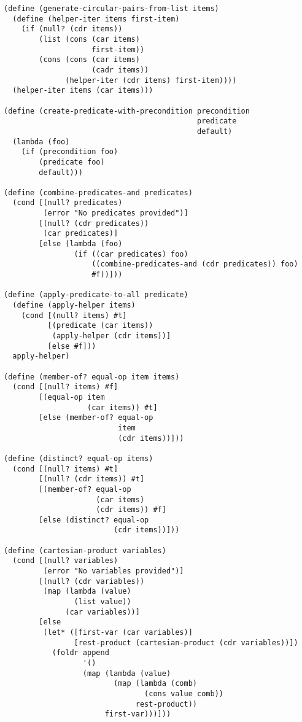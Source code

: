 \documentclass[../main.tex]{subfiles}
\begin{document}
\begin{lstlisting}
(define (generate-circular-pairs-from-list items)
  (define (helper-iter items first-item)
    (if (null? (cdr items))
        (list (cons (car items)
                    first-item))
        (cons (cons (car items)
                    (cadr items))
              (helper-iter (cdr items) first-item))))
  (helper-iter items (car items)))

(define (create-predicate-with-precondition precondition
                                            predicate
                                            default)
  (lambda (foo)
    (if (precondition foo)
        (predicate foo)
        default)))

(define (combine-predicates-and predicates)
  (cond [(null? predicates)
         (error "No predicates provided")]
        [(null? (cdr predicates))
         (car predicates)]
        [else (lambda (foo)
                (if ((car predicates) foo)
                    ((combine-predicates-and (cdr predicates)) foo)
                    #f))]))

(define (apply-predicate-to-all predicate)
  (define (apply-helper items)
    (cond [(null? items) #t]
          [(predicate (car items))
           (apply-helper (cdr items))]
          [else #f]))
  apply-helper)

(define (member-of? equal-op item items)
  (cond [(null? items) #f]
        [(equal-op item
                   (car items)) #t]
        [else (member-of? equal-op
                          item
                          (cdr items))]))

(define (distinct? equal-op items)
  (cond [(null? items) #t]
        [(null? (cdr items)) #t]
        [(member-of? equal-op
                     (car items)
                     (cdr items)) #f]
        [else (distinct? equal-op
                         (cdr items))]))

(define (cartesian-product variables)
  (cond [(null? variables)
         (error "No variables provided")]
        [(null? (cdr variables))
         (map (lambda (value)
                (list value))
              (car variables))]
        [else
         (let* ([first-var (car variables)]
                [rest-product (cartesian-product (cdr variables))])
           (foldr append
                  '()
                  (map (lambda (value)
                         (map (lambda (comb)
                                (cons value comb))
                              rest-product))
                       first-var)))]))


\end{lstlisting}
\end{document}
